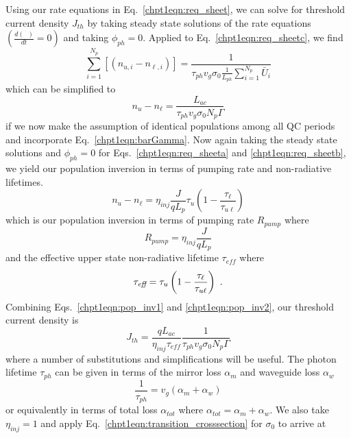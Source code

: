 {Using our rate equations in Eq.~\eqref{chpt1eqn:req_sheet}, we can solve for threshold current density $J_{th}$ by taking steady state solutions of the rate equations $\left(\frac{d (\;\;)}{d\!t}=0\right)$ and taking $\phi_{ph}=0$.  Applied to Eq.~\eqref{chpt1eqn:req_sheetc}, we find
\begin{equation}
\sum_{i=1}^{N_p}\left[ \left(n_{u,i} - n_{\ell,i}\right) \right] = \frac{1}{\tau_{ph} v_g \sigma_0 \frac{1}{L_{ph}} \sum_{i=1}^{N_p} \bar{U}_i}
\end{equation}
which can be simplified to
\begin{equation}
\label{chpt1eqn:pop_inv1}
n_u - n_\ell = \frac{L_{ac}}{\tau_{ph} v_g \sigma_0  N_p \Gamma}
\end{equation}
if we now make the assumption of identical populations among all QC periods and incorporate Eq.~\eqref{chpt1eqn:barGamma}.  Now again taking the steady state solutions and $\phi_{ph}=0$ for Eqs.~\eqref{chpt1eqn:req_sheeta} and \eqref{chpt1eqn:req_sheetb}, we yield our population inversion in terms of pumping rate and non-radiative lifetimes.
\begin{equation}
\label{chpt1eqn:pop_inv2}
n_u-n_\ell = \eta_\textit{inj} \frac{J}{q L_{p}} \tau_u \left(1-\frac{\tau_\ell}{\tau_{u\ell}}\right)
\end{equation}
which is our population inversion in terms of pumping rate $R_\textit{pump}$ where
\begin{equation}
R_\textit{pump} = \eta_\textit{inj} \frac{J}{q L_{p}}
\end{equation}
and the effective upper state non-radiative lifetime $\tau_\textit{eff}$ where
\begin{equation}
\tau_\textit{eff}=\tau_u \left(1-\frac{\tau_\ell}{\tau_{u\ell}}\right) \textnormal{~.}
\end{equation}
Combining Eqs.~\eqref{chpt1eqn:pop_inv1} and \eqref{chpt1eqn:pop_inv2}, our threshold current density is
\begin{equation}
J_{th} = \frac{q L_{ac}}{\eta_\textit{inj} \tau_\textit{eff}} \frac{1}{\tau_{ph} v_g \sigma_0  N_p \Gamma}
\end{equation}
where a number of substitutions and simplifications will be useful.  The photon lifetime $\tau_{ph}$ can be given in terms of the mirror loss $\alpha_m$ and waveguide loss $\alpha_w$ 
\begin{equation}
\frac{1}{\tau_{ph}}=v_g (\alpha_m + \alpha_w)
\end{equation}
or equivalently in terms of total loss $\alpha_\textit{tot}$ where $\alpha_\textit{tot}=\alpha_m+\alpha_w$.  We also take $\eta_\textit{inj}=1$ and apply Eq.~\eqref{chpt1eqn:transition_crosssection} for $\sigma_0$ to arrive at
}
